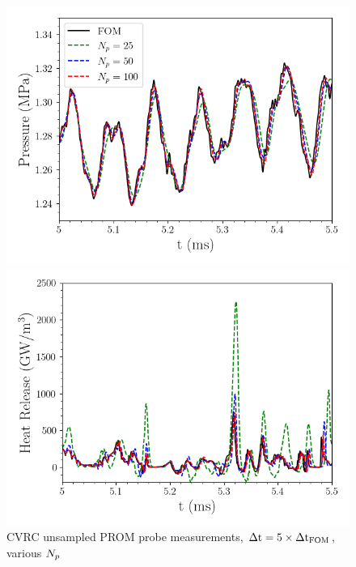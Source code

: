 \begin{figure}
	\begin{minipage}{0.49\linewidth}
		\includegraphics[width=0.99\linewidth]{Chapters/HPROMResults/Images/cvrc/unsampled/pressure_probe_unsampled_modes.png}
	\end{minipage}
	\begin{minipage}{0.49\linewidth}
		\includegraphics[width=0.99\linewidth]{Chapters/HPROMResults/Images/cvrc/unsampled/heat_probe_unsampled_modes.png}
	\end{minipage}
	\caption{\label{fig:cvrcUnsampledROMProbes}CVRC unsampled PROM probe measurements, $\Delta \text{t} = 5 \times \Delta \text{t}_{\text{FOM}}$, various $N_p$}
\end{figure}


